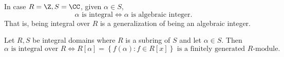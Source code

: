 \documentclass[pmath441]{subfiles}
\begin{document}
    \begin{example}{}
        In case $R=\Z, S=\CC$, given $\alpha\in S$,
        \begin{equation*}
            \text{$\alpha$ is integral} \iff \text{$\alpha$ is algebraic integer}.
        \end{equation*}
        That is, being integral over $R$ is a generalization of being an algebraic integer.
    \end{example}

    \rruleline
    
    \begin{theorem}{}
        Let $R,S$ be integral domains where $R$ is a subring of $S$ and let $\alpha\in S$. Then
        \begin{equation*}
            \text{$\alpha$ is integral over $R$} \iff R\left[ \alpha \right] = \left\lbrace f\left( \alpha \right):f\in R\left[ x \right] \right\rbrace \text{ is a finitely generated $R$-module}.
        \end{equation*}
    \end{theorem}
    
\end{document}
